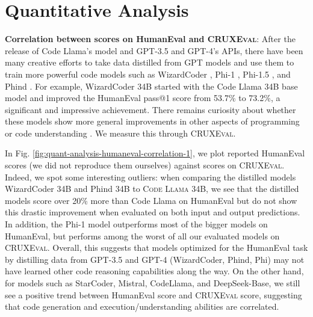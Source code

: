 \documentclass{article}
\newcommand{\benchmark}{\textsc{CRUXEval}\xspace}
\newcommand{\codellamalarge}{\textsc{Code Llama 34B}\xspace}
\begin{document}
\section{Quantitative Analysis} \label{sec:quantitative-analysis}

\textbf{Correlation between scores on HumanEval and \benchmark}: After the release of Code Llama's model and GPT-3.5 and GPT-4's APIs, there have been many creative efforts to take data distilled from GPT models and use them to train more powerful code models such as WizardCoder \citep{luo2023wizardcoder}, Phi-1 \citep{gunasekar2023textbooks}, Phi-1.5 \citep{gunasekar2023textbooks}, and Phind \citep{Phind}. For example, WizardCoder 34B started with the Code Llama 34B base model and improved the HumanEval pass@1 score from 53.7\% to 73.2\%, a significant and impressive achievement. There remains curiosity about whether these models show more general improvements in other aspects of programming or code understanding \citep{gudibande2023false}. We measure this through \benchmark.

In Fig. \ref{fig:quant-analysis-humaneval-correlation-1}, we plot reported HumanEval scores (we did not reproduce them ourselves) against scores on \benchmark. Indeed, we spot some interesting outliers: when comparing the distilled models WizardCoder 34B and Phind 34B to \codellamalarge, we see that the distilled models score over 20\% more than Code Llama on HumanEval but do not show this drastic improvement when evaluated on both input and output predictions. In addition, the Phi-1 model outperforms most of the bigger models on HumanEval, but performs among the worst of all our evaluated models on \benchmark. Overall, this suggests that models optimized for the HumanEval task by distilling data from GPT-3.5 and GPT-4 (WizardCoder, Phind, Phi) may not have learned other code reasoning capabilities along the way. On the other hand, for models such as StarCoder, Mistral, CodeLlama, and DeepSeek-Base, we still see a positive trend between HumanEval score and \benchmark score, suggesting that code generation and execution/understanding abilities are correlated.
\end{document}
